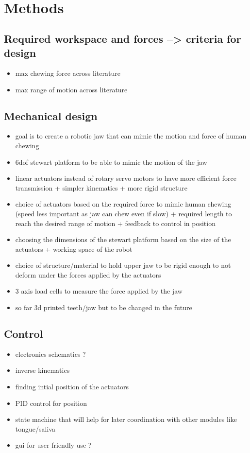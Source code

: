 \section{Methods}

\subsection{Required workspace and forces --> criteria for design}
\begin{itemize}
    \item max chewing force across literature
    \item max range of motion across literature
\end{itemize}

\subsection{Mechanical design}
\begin{itemize}
    \item goal is to create a robotic jaw that can mimic the motion and force of human chewing 
    \item 6dof stewart platform to be able to mimic the motion of the jaw
    \item linear actuators instead of rotary servo motors to have more efficient force transmission + simpler kinematics + more rigid structure
    \item choice of actuators based on the required force to mimic human chewing (speed less important as jaw can chew even if slow) + required length to reach the desired range of motion + feedback to control in position
    \item choosing the dimensions of the stewart platform based on the size of the actuators + working space of the robot
    \item choice of structure/material to hold upper jaw to be rigid enough to not deform under the forces applied by the actuators 
    \item 3 axis load cells to measure the force applied by the jaw
    \item so far 3d printed teeth/jaw but to be changed in the future
\end{itemize}

\subsection{Control}
\begin{itemize}
    \item electronics schematics ?
    \item inverse kinematics
    \item finding intial position of the actuators
    \item PID control for position
    \item state machine that will help for later coordination with other modules like tongue/saliva
    \item gui for user friendly use ?
\end{itemize}

